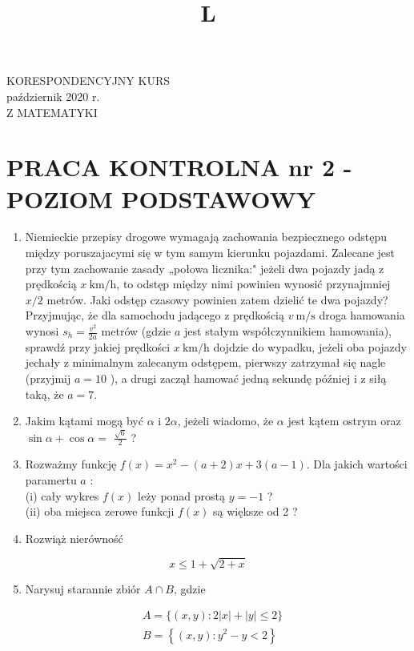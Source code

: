 \documentclass[10pt]{article}
\title{L }
\author{}
\date{}
\begin{document}
\maketitle
KORESPONDENCYJNY KURS\\
październik 2020 r.\\
Z MATEMATYKI

\section*{PRACA KONTROLNA nr 2 - POZIOM PODSTAWOWY}
\begin{enumerate}
  \item Niemieckie przepisy drogowe wymagają zachowania bezpiecznego odstępu między poruszajacymi się w tym samym kierunku pojazdami. Zalecane jest przy tym zachowanie zasady „połowa licznika:" jeżeli dwa pojazdy jadą z prędkością $x \mathrm{~km} / \mathrm{h}$, to odstęp między nimi powinien wynosić przynajmniej $x / 2$ metrów. Jaki odstęp czasowy powinien zatem dzielić te dwa pojazdy? Przyjmując, że dla samochodu jadącego z prędkością $v \mathrm{~m} / \mathrm{s}$ droga hamowania wynosi $s_{h}=\frac{v^{2}}{2 a}$ metrów (gdzie $a$ jest stałym współczynnikiem hamowania), sprawdź przy jakiej prędkości $x \mathrm{~km} / \mathrm{h}$ dojdzie do wypadku, jeżeli oba pojazdy jechały z minimalnym zalecanym odstępem, pierwszy zatrzymał się nagle (przyjmij $a=10$ ), a drugi zaczął hamować jedną sekundę później i z siłą taką, że $a=7$.
  \item Jakim kątami mogą być $\alpha$ i $2 \alpha$, jeżeli wiadomo, że $\alpha$ jest kątem ostrym oraz $\sin \alpha+\cos \alpha=$ $\frac{\sqrt{6}}{2}$ ?
  \item Rozważmy funkcję $f(x)=x^{2}-(a+2) x+3(a-1)$. Dla jakich wartości paramertu $a$ :\\
(i) cały wykres $f(x)$ leży ponad prostą $y=-1$ ?\\
(ii) oba miejsca zerowe funkcji $f(x)$ są większe od 2 ?
  \item Rozwiąż nierówność
\end{enumerate}

$$
x \leqslant 1+\sqrt{2+x}
$$

\begin{enumerate}
  \setcounter{enumi}{4}
  \item Narysuj starannie zbiór $A \cap B$, gdzie
\end{enumerate}

$$
\begin{aligned}
& A=\{(x, y): 2|x|+|y| \leqslant 2\} \\
& B=\left\{(x, y): y^{2}-y<2\right\}
\end{aligned}
$$
\end{document}
